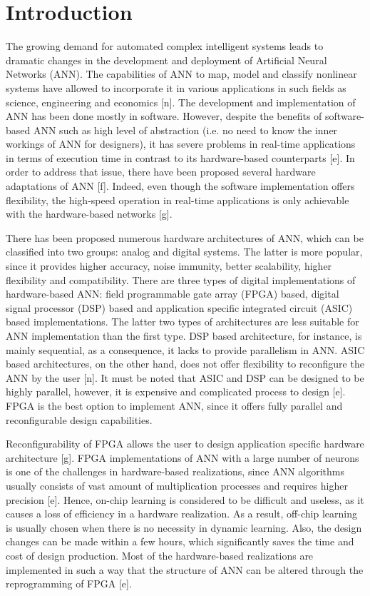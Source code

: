\section{Introduction}
The growing demand for automated complex intelligent systems leads to dramatic changes in the development and deployment of Artificial Neural Networks (ANN). The capabilities of ANN to map, model and classify nonlinear systems have allowed to incorporate it in various applications in such fields as science, engineering and economics [n]. The development and implementation of ANN has been done mostly in software. However, despite the benefits of software-based ANN such as high level of abstraction (i.e. no need to know the inner workings of ANN for designers), it has severe problems in real-time applications in terms of execution time in contrast to its hardware-based counterparts [e]. In order to address that issue, there have been proposed several hardware adaptations of ANN [f]. Indeed, even though the software implementation offers flexibility, the high-speed operation in real-time applications is only achievable with the hardware-based networks [g].


There has been proposed numerous hardware architectures of ANN, which can be classified into two groups: analog and digital systems. The latter is more popular, since it provides higher accuracy, noise immunity, better scalability, higher flexibility and compatibility. There are three types of digital implementations of hardware-based ANN: field programmable gate array (FPGA) based, digital signal processor (DSP) based and application specific integrated circuit (ASIC) based implementations.  The latter two types of architectures are less suitable for ANN implementation than the first type. DSP based architecture, for instance, is mainly sequential, as a consequence, it lacks to provide parallelism in ANN. ASIC based architectures, on the other hand, does not offer flexibility to reconfigure the ANN by the user [n]. It must be noted that ASIC and DSP can be designed to be highly parallel, however, it is expensive and complicated process to design [e]. FPGA is the best option to implement ANN, since it offers fully parallel and reconfigurable design capabilities.


Reconfigurability of FPGA allows the user to design application specific hardware architecture [g]. FPGA implementations of ANN with a large number of neurons is one of the challenges in hardware-based realizations, since ANN algorithms usually consists of vast amount of multiplication processes and requires higher precision [e]. Hence, on-chip learning is considered to be difficult and useless, as it causes a loss of efficiency in a hardware realization. As a result, off-chip learning is usually chosen when there is no necessity in dynamic learning. Also, the design changes can be made within a few hours, which significantly saves the time and cost of design production. Most of the hardware-based realizations are implemented in such a way that the structure of ANN can be altered through the reprogramming of FPGA [e].


